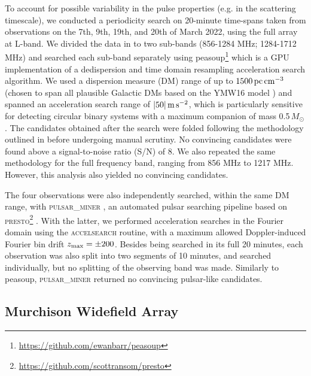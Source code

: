 \documentclass[fleqn,usenatbib]{mnras}
\begin{document}
To account for possible variability in the pulse properties (e.g. in the scattering timescale), we conducted a periodicity search on 20-minute time-spans taken from observations on the 7th, 9th, 19th, and 20th of March 2022, using the full array at L-band. We divided the data in to two sub-bands (856-1284 MHz; 1284-1712 MHz) and searched each sub-band separately using {\sc peasoup}\footnote{\url{https://github.com/ewanbarr/peasoup}}
which is a GPU implementation of a dedispersion and time domain resampling acceleration search algorithm. We used a dispersion measure (DM) range of up to $1500 \rm \, pc \, cm^{-3}$ (chosen to span all plausible Galactic DMs based on the YMW16 model \citealp{2017ApJ...835...29Y}) and spanned an acceleration search range of $|50| \, \rm m \, s^{-2}$, which is particularly sensitive for detecting circular binary systems with a maximum companion of mass 0.5\,$M_{\odot}$. The candidates obtained after the search were folded following the methodology outlined in \citet{2023MNRAS.522.1071S} before undergoing manual scrutiny. No convincing candidates were found above a signal-to-noise ratio (S/N) of 8. We also repeated the same methodology for the full frequency band, ranging from 856 MHz to 1217 MHz. However, this analysis also yielded no convincing candidates.

The four observations were also independently searched, within the same DM range, with \textsc{pulsar\_miner} \citep{2021MNRAS.504.1407R}, an automated pulsar searching pipeline based on \textsc{presto}\footnote{\url{https://github.com/scottransom/presto}} \citep{Ransom_New_search_techniques_2001}. With the latter, we performed acceleration searches in the Fourier domain using the \textsc{accelsearch} routine, with a maximum allowed Doppler-induced Fourier bin drift $z_{\rm max} = \pm 200$. Besides being searched in its full 20 minutes, each observation was also split into two segments of 10 minutes, and searched individually, but no splitting of the observing band was made. Similarly to {\sc peasoup}, \textsc{pulsar\_miner} returned no convincing pulsar-like candidates.

\subsection{Murchison Widefield Array}
\end{document}
